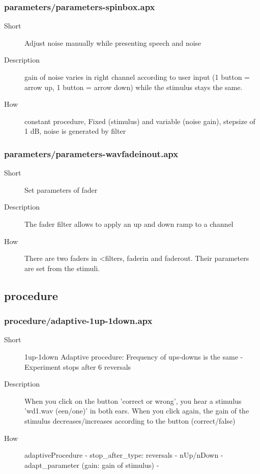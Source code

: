 \subsubsection{parameters/parameters-spinbox.apx}
\begin{description}
\item[Short] 
 Adjust noise manually while presenting speech and noise
\item[Description] 
 gain of noise varies in right channel according to user input (1 button = arrow up, 1 button = arrow down) while the stimulus stays the same.
\item[How] 
 constant procedure, Fixed (stimulus) and variable (noise gain), stepsize of 1 dB, noise is generated by filter
\end{description}

\subsubsection{parameters/parameters-wavfadeinout.apx}
\begin{description}
\item[Short] 
 Set parameters of fader
\item[Description] 
 The fader filter allows to apply an up and down ramp to a channel
\item[How] 
 There are two faders in \textless{}filters, faderin and faderout. Their parameters are set from the stimuli.
\end{description}

\subsection{procedure}
\subsubsection{procedure/adaptive-1up-1down.apx}
\begin{description}
\item[Short] 
 1up-1down Adaptive procedure: Frequency of ups-downs is the same - Experiment stops after 6 reversals
\item[Description] 
 When you click on the button 'correct or wrong', you hear a stimulus 'wd1.wav (een/one)' in both ears. When you click again, the gain of the stimulus decreases/increases according to the button (correct/false)
\item[How] 
 adaptiveProcedure - stop\_after\_type: reversals - nUp/nDown - adapt\_parameter (gain: gain of stimulus) -
\end{description}

